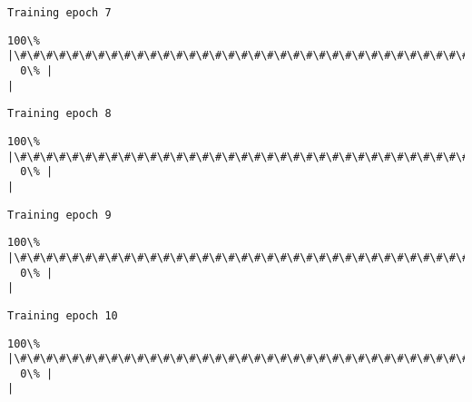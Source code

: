 \documentclass[11pt]{article}
\begin{document}
    \begin{Verbatim}[commandchars=\\\{\}]
Training epoch 7

    \end{Verbatim}

    \begin{Verbatim}[commandchars=\\\{\}]
100\% |\#\#\#\#\#\#\#\#\#\#\#\#\#\#\#\#\#\#\#\#\#\#\#\#\#\#\#\#\#\#\#\#\#\#\#\#\#\#\#\#\#\#\#\#\#\#\#\#\#\#\#\#\#\#\#\#\#\#\#\#\#\#\#\#\#\#\#\#\#\#\#\#|
  0\% |                                                                        |
    \end{Verbatim}

    \begin{Verbatim}[commandchars=\\\{\}]
Training epoch 8

    \end{Verbatim}

    \begin{Verbatim}[commandchars=\\\{\}]
100\% |\#\#\#\#\#\#\#\#\#\#\#\#\#\#\#\#\#\#\#\#\#\#\#\#\#\#\#\#\#\#\#\#\#\#\#\#\#\#\#\#\#\#\#\#\#\#\#\#\#\#\#\#\#\#\#\#\#\#\#\#\#\#\#\#\#\#\#\#\#\#\#\#|
  0\% |                                                                        |
    \end{Verbatim}

    \begin{Verbatim}[commandchars=\\\{\}]
Training epoch 9

    \end{Verbatim}

    \begin{Verbatim}[commandchars=\\\{\}]
100\% |\#\#\#\#\#\#\#\#\#\#\#\#\#\#\#\#\#\#\#\#\#\#\#\#\#\#\#\#\#\#\#\#\#\#\#\#\#\#\#\#\#\#\#\#\#\#\#\#\#\#\#\#\#\#\#\#\#\#\#\#\#\#\#\#\#\#\#\#\#\#\#\#|
  0\% |                                                                        |
    \end{Verbatim}

    \begin{Verbatim}[commandchars=\\\{\}]
Training epoch 10

    \end{Verbatim}

    \begin{Verbatim}[commandchars=\\\{\}]
100\% |\#\#\#\#\#\#\#\#\#\#\#\#\#\#\#\#\#\#\#\#\#\#\#\#\#\#\#\#\#\#\#\#\#\#\#\#\#\#\#\#\#\#\#\#\#\#\#\#\#\#\#\#\#\#\#\#\#\#\#\#\#\#\#\#\#\#\#\#\#\#\#\#|
  0\% |                                                                        |
    \end{Verbatim}
\end{document}
